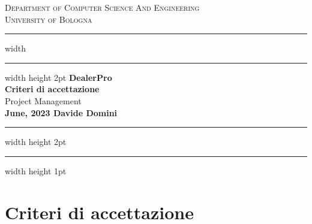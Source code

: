\documentclass{article}
\begin{document}
\begin{titlepage}

  \newcommand{\HRule}{\rule{\linewidth}{0.5mm}}
  \center
  
  \textsc{\Large Department of Computer Science And Engineering}\\[0.5cm]
  
  \textsc{\Large University of Bologna}\\[0.6cm]
  
  \hrule width \hsize \kern 1mm \hrule width \hsize height 2pt 
  \vspace{0.8cm}
  { \large \bfseries DealerPro}\\[0.6cm]
  { \large \bfseries Criteri di accettazione}\\[0.6cm]
  { \large Project Management}\\[0.6cm]
  
  
  {\bfseries{June, 2023}
  \hfill
  \bfseries{Davide Domini}}\\[0.6cm]
  
  \hrule width \hsize height 2pt \kern 1mm \hrule width \hsize height 1pt
  \vspace{0.4cm}
  
  \end{titlepage}

  \clearpage
  
  \section*{Criteri di accettazione}
  
\end{document}
